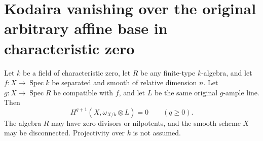 \section{Kodaira vanishing over the original arbitrary affine base in characteristic zero}

\begin{theorem}
\label{thm:kn-relative-kodaira-characteristic-zero}
\leanok
Let $k$ be a field of characteristic zero, let $R$ be any
finite-type $k$-algebra, and let
$f:X\to\operatorname{Spec}k$ be separated and smooth of
relative dimension $n$.  Let
$g:X\to\operatorname{Spec}R$ be compatible with $f$, and let
$L$ be the same original $g$-ample line.  Then
\[
 H^{q+1}(X,\omega_{X/k}\otimes L)=0
 \qquad(q\geq0).
\]
The algebra $R$ may have zero divisors or nilpotents, and the
smooth scheme $X$ may be disconnected.  Projectivity over $k$
is not assumed.
\end{theorem}
